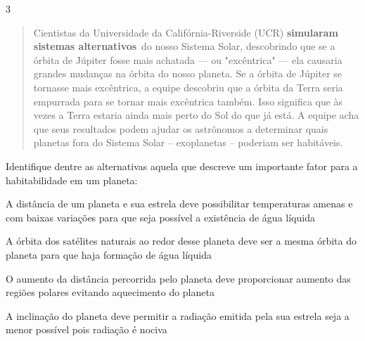 {{

\num{3}

\begin{quote}
Cientistas da Universidade da Califórnia-Riverside
(UCR) \textbf{simularam sistemas alternativos}~do nosso Sistema Solar,
descobrindo que se a órbita de Júpiter fosse mais achatada --- ou
"excêntrica" --- ela causaria grandes mudanças na órbita
do nosso
planeta. Se a órbita de Júpiter se tornasse mais excêntrica, a equipe
descobriu que a órbita da Terra seria empurrada para se tornar mais
excêntrica também. Isso significa que às vezes a Terra estaria ainda
mais perto do Sol do que já está. A equipe acha que seus resultados
podem ajudar os astrônomos a determinar quais planetas fora do Sistema
Solar -- exoplanetas -- poderiam ser habitáveis.

\end{quote}

Identifique dentre as alternativas aquela que descreve um importante
fator para a habitabilidade em um planeta:

\begin{escolha}
\item
  A distância de um planeta e sua estrela deve possibilitar temperaturas
  amenas e com baixas variações para que seja possível a existência de
  água líquida
\item
  A órbita dos satélites naturais ao redor desse planeta deve ser a
  mesma órbita do planeta para que haja formação de água líquida
\item
  O aumento da distância percorrida pelo planeta deve proporcionar
  aumento das regiões polares evitando aquecimento do planeta
\item
  A inclinação do planeta deve permitir a radiação emitida pela sua
  estrela seja a menor possível pois radiação é nociva
\end{escolha}

}}
